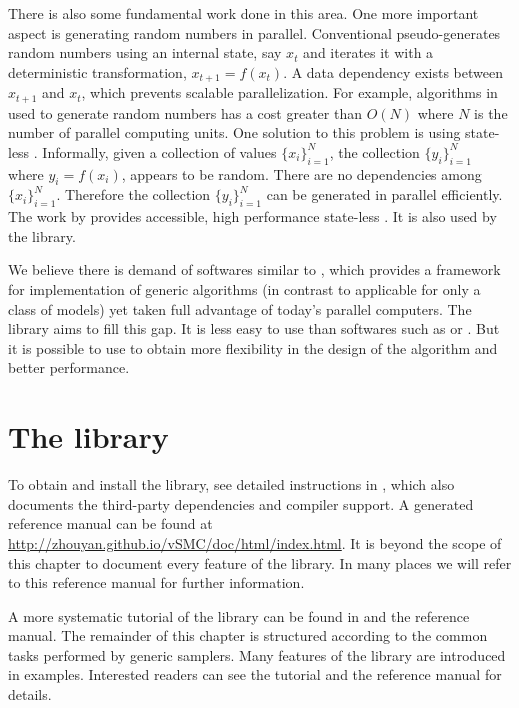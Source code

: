 There is also some fundamental work done in this area. One more important aspect is generating random numbers in parallel. Conventional pseudo-\rng generates random numbers using an internal state, say $x_t$ and iterates it with a deterministic transformation, $x_{t+1} = f(x_t)$. A data dependency exists between $x_{t+1}$ and $x_t$, which prevents scalable parallelization. For example, algorithms in \cite{Lee:2010fm} used to generate random numbers has a cost greater than $O(N)$ where $N$ is the number of parallel computing units. One solution to this problem is using state-less \rng. Informally, given a collection of values $\{x_i\}_{i=1}^N$, the collection $\{y_i\}_{i=1}^N$ where $y_i = f(x_i)$, appears to be random. There are no dependencies among $\{x_i\}_{i=1}^N$. Therefore the collection $\{y_i\}_{i=1}^N$ can be generated in parallel efficiently. The work by \cite{Salmon:2011um} provides accessible, high performance state-less \rng. It is also used by the \vsmc library.

We believe there is demand of softwares similar to \smctc, which provides a framework for implementation of generic \smc algorithms (in contrast to applicable for only a class of models) yet taken full advantage of today's parallel computers. The \vsmc library aims to fill this gap. It is less easy to use than softwares such as \libbi or \biips. But it is possible to use to obtain more flexibility in the design of the algorithm and better performance.

\section{The \protect\vsmc library}
\label{sec:The vSMC library}

To obtain and install the library, see detailed instructions in \cite{vsmcjss}, which also documents the third-party dependencies and compiler support. A \doxygen \cite{doxygen} generated reference manual can be found at \url{http://zhouyan.github.io/vSMC/doc/html/index.html}. It is beyond the scope of this chapter to document every feature of the \vsmc library. In many places we will refer to this reference manual for further information.

A more systematic tutorial of the library can be found in \cite{vsmcjss} and the reference manual. The remainder of this chapter is structured according to the common tasks performed by generic \smc samplers. Many features of the library are introduced in examples. Interested readers can see the tutorial \cite{vsmcjss} and the reference manual for details.

